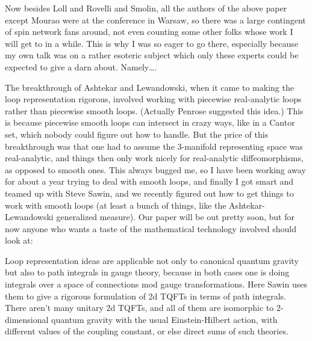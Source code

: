 \documentclass{article}
\def\tightlist{}
\renewcommand{\texttt}[1]{%
  \begingroup
  \ttfamily
  \begingroup\lccode`~=`/\lowercase{\endgroup\def~}{/\discretionary{}{}{}}%
  \begingroup\lccode`~=`[\lowercase{\endgroup\def~}{[\discretionary{}{}{}}%
  \begingroup\lccode`~=`.\lowercase{\endgroup\def~}{.\discretionary{}{}{}}%
  \catcode`/=\active\catcode`[=\active\catcode`.=\active
  \scantokens{#1\noexpand}%
  \endgroup
}
\begin{document}
Now besides Loll and Rovelli and Smolin, all the authors of the above
paper except Mourao were at the conference in Warsaw, so there was a
large contingent of spin network fans around, not even counting some
other folks whose work I will get to in a while. This is why I was so
eager to go there, especially because my own talk was on a rather
esoteric subject which only these experts could be expected to give a
darn about. Namely\ldots.

The breakthrough of Ashtekar and Lewandowski, when it came to making the
loop representation rigorous, involved working with piecewise
real-analytic loops rather than piecewise smooth loops. (Actually
Penrose suggested this idea.) This is because piecewise smooth loops can
intersect in crazy ways, like in a Cantor set, which nobody could figure
out how to handle. But the price of this breakthrough was that one had
to assume the 3-manifold representing space was real-analytic, and
things then only work nicely for real-analytic diffeomorphisms, as
opposed to smooth ones. This always bugged me, so I have been working
away for about a year trying to deal with smooth loops, and finally I
got smart and teamed up with Steve Sawin, and we recently figured out
how to get things to work with smooth loops (at least a bunch of things,
like the Ashtekar-Lewandowski generalized measure). Our paper will be
out pretty soon, but for now anyone who wants a taste of the
mathematical technology involved should look at:


Loop representation ideas are applicable not only to canonical quantum
gravity but also to path integrals in gauge theory, because in both
cases one is doing integrals over a space of connections mod gauge
transformations. Here Sawin uses them to give a rigorous formulation of
2d TQFTs in terms of path integrals. There aren't many unitary 2d TQFTs,
and all of them are isomorphic to 2-dimensional quantum gravity with the
usual Einstein-Hilbert action, with different values of the coupling
constant, or else direct sums of such theories.
\end{document}
